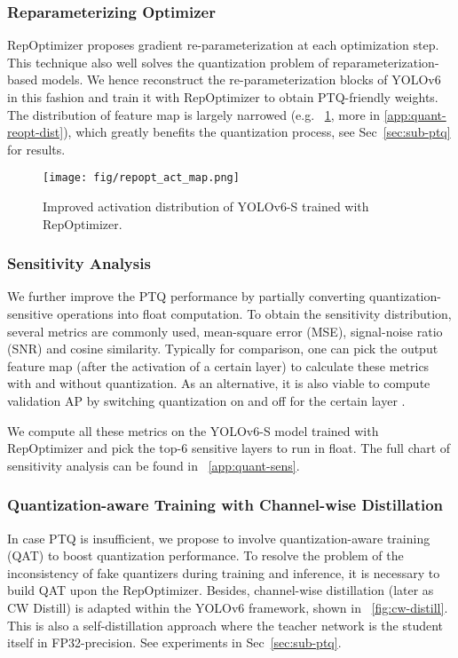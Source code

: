 \documentclass[10pt,twocolumn,letterpaper]{article}
\begin{document}
\subsubsection{Reparameterizing Optimizer}

RepOptimizer \cite{ding2022re} proposes gradient re-parameterization at each optimization step.  This technique also well solves the quantization problem of reparameterization-based models. We hence reconstruct the re-parameterization blocks of YOLOv6 in this fashion and train it with RepOptimizer to obtain PTQ-friendly weights. The distribution of feature map is largely narrowed (e.g. ~\cref{fig:repopt_act_map}, more in \ref{app:quant-reopt-dist}), which greatly benefits the quantization process, see Sec~\ref{sec:sub-ptq} for results.

  
    \begin{figure}[htp]
    \centering
    \texttt{[image: fig/repopt\_act\_map.png]}
    \caption{Improved activation distribution of YOLOv6-S trained with RepOptimizer.}
    \label{fig:repopt_act_map}
  \end{figure}

\subsubsection{Sensitivity Analysis}\label{quant:sens}
We further improve the PTQ performance by partially converting quantization-sensitive operations into float computation. To obtain the sensitivity distribution, several metrics are commonly used, mean-square error (MSE), signal-noise ratio (SNR) and cosine similarity. Typically for comparison, one can pick the output feature map (after the activation of a certain layer) to calculate these metrics with and without quantization. As an alternative, it is also viable to compute validation AP by switching quantization on and off for the certain layer \cite{nvidia2021pq}.

We compute all these metrics on the YOLOv6-S model trained with RepOptimizer and pick the top-6 sensitive layers to run in float. The full chart of sensitivity analysis can be found in ~\ref{app:quant-sens}.


\subsubsection{Quantization-aware Training with Channel-wise Distillation}
In case PTQ is insufficient, we propose to involve quantization-aware training (QAT) to boost quantization performance. To resolve the problem of the inconsistency of fake quantizers during training and inference, it is necessary to build QAT upon the RepOptimizer. Besides, channel-wise distillation \cite{shu2021channel} (later as CW Distill) is adapted within the YOLOv6 framework, shown in ~\cref{fig:cw-distill}. This is also a self-distillation approach where the teacher network is the student itself in FP32-precision. See experiments in Sec~\ref{sec:sub-ptq}.
\end{document}
